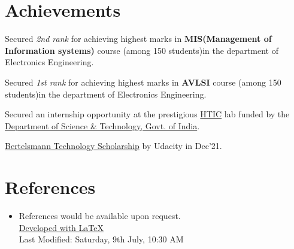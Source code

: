 \documentclass[a4paper,20pt]{article}
\newcommand{\resumeSubHeadingListStart}{\begin{itemize}[leftmargin=*]}
\newcommand{\resumeSubHeadingListEnd}{\end{itemize}}
\begin{document}
\section{Achievements}
\begin{description}[font=$\bullet$]
\item{Secured \textit{2nd rank} for achieving highest marks in \textbf{MIS(Management of Information systems)} course (among 150 students)in the department of Electronics Engineering.}
\item{Secured \textit{1st rank} for achieving highest marks in \textbf{AVLSI} course (among 150 students)in the department of Electronics Engineering.}
\item{Secured an internship opportunity at the prestigious \href{http://hticlab.org/htic/}{HTIC} lab funded by the \href{https://dst.gov.in/}{Department of Science \& Technology, Govt. of India}.}
\item{\href{https://www.udacity.com/bertelsmann-tech-scholarships}{Bertelsmann Technology Scholarship} by Udacity in Dec'21.}
\end{description}
\vspace{2pt}

\section{References}
  \resumeSubHeadingListStart
   \item References would be available upon request.\\
   \vspace{245 pt}
   {\href{https://raw.githubusercontent.com/addy1997/CV/main/Adwait_CV.tex}{Developed with \LaTeX}} \\
   {Last Modified: Saturday, 9th July, 10:30 AM}
  \resumeSubHeadingListEnd
\end{document}
